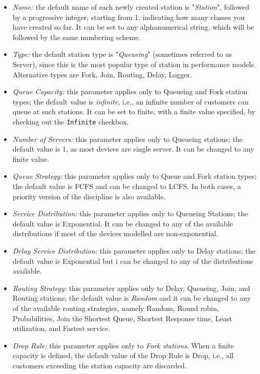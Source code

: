 \begin{itemize}
\item \emph{Name:} the default name of each newly created station
is "\emph{Station}", followed by a progressive integer, starting
from 1, indicating how many classes you have created so far. It
can be set to any alphanumerical string, which will be followed by
the same numbering scheme. \item \emph{Type:} the default station
type is "\emph{Queueing}" (sometimes referred to as Server), since
this is the most popular type of station in performance models.
Alternative types are Fork, Join, Routing, Delay, Logger. \item
\emph{Queue Capacity:} this parameter applies only to Queueing and
Fork station types; the default value is \emph{infinite}, i.e., an
infinite number of customers can queue at such stations. It can be
set to finite, with a finite value specified, by checking out the
\texttt{Infinite} checkbox. \item \emph{Number of Servers:} this
parameter applies only to Queueing stations; the default value is
1, as most devices are single server. It can be changed to any
finite value. \item \emph{Queue Strategy:} this parameter applies
only to Queue and Fork station types; the default value is FCFS
and can be changed to LCFS. In both cases, a priority version of
the discipline is also available. \item \emph{Service
Distribution:} this parameter applies only to Queueing Stations;
the default value is Exponential. It can be changed to any of the
available distributions if most of the devices modelled are
non-exponential. \item \emph{Delay Service Distribution:} this
parameter applies only to Delay stations; the default value is
Exponential but i can be changed to any of the distributions
available. \item \emph{Routing Strategy:} this parameter applies
only to Delay, Queueing, Join, and Routing stations; the default
value is \emph{Random} and it can be changed to any of the
available routing strategies, namely Random, Round robin,
Probabilities, Join the Shortest Queue, Shortest Response time,
Least utilization, and Fastest service. \item \emph{Drop Rule:}
this parameter applies only to \emph{Fork stations}. When a finite
capacity is defined, the default value of the Drop Rule is Drop,
i.e., all customers exceeding the station capacity are discarded.

\end{itemize}
